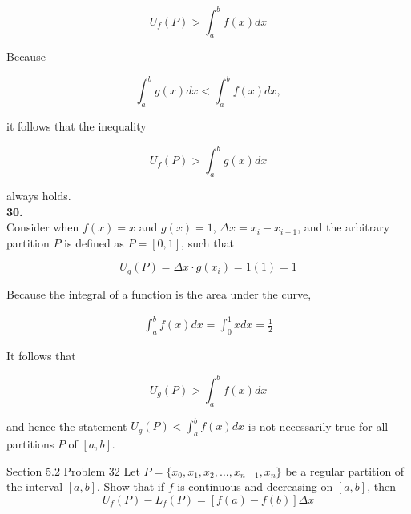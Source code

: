 \documentclass{article}
\begin{document}
    \[
        U_f (P)> \int^b_a f(x)dx
    \]

    Because

    \[
        \int^b_a g(x)dx < \int^b_a f(x)dx,
    \]

    it follows that the inequality

    \[
        U_f (P) > \int^b_a g(x)dx
    \]

    always holds. \\

    \textbf{30.} \\
    Consider when $f(x)=x$ and $g(x)=1$, $\Delta x = x_i - x_{i-1}$, and the arbitrary partition $P$ is defined as $P=[0,1]$, such that

    \[
        U_g (P) = \Delta x\cdot g(x_i) = 1(1) = 1
    \]

    Because the integral of a function is the area under the curve,

    \begin{align*}
        \int^b_a f(x)dx = \int^1_{0} xdx = \frac{1}{2}
    \end{align*}

    It follows that

    \[
        U_g (P) > \int^b_a f(x)dx
    \]

    and hence the statement $U_g (P) < \int^b_a f(x)dx$ is not necessarily true for all partitions $P$ of $[a,b]$.

    \pagebreak
    \thispagestyle{5}



    \begin{tbhtheorem}{Section 5.2 Problem 32}
        Let $P=\{x_0, x_1, x_2, \dots, x_{n-1}, x_n\}$ be a regular partition of the interval $[a,b]$. Show that if $f$ is continuous and decreasing on $[a,b]$, then
        \[
            U_f (P) - L_f (P) = [f(a) - f(b)] \Delta x
        \]
    \end{tbhtheorem}
\end{document}
